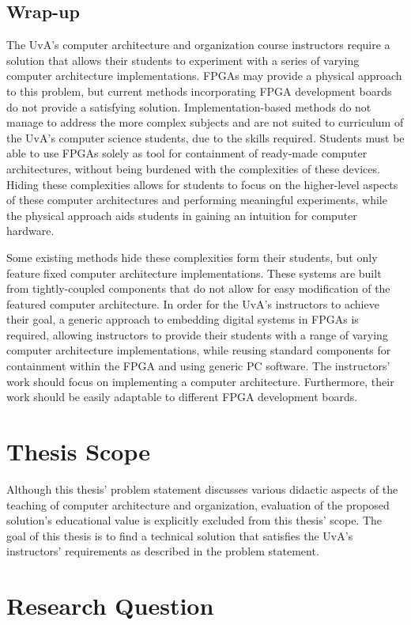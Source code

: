 \documentclass[main.tex]{subfiles}
\begin{document}
\subsection{Wrap-up}
The UvA's computer architecture and organization course instructors require a solution that allows their students to experiment with a series of varying computer architecture implementations. FPGAs may provide a physical approach to this problem, but current methods incorporating FPGA development boards do not provide a satisfying solution. Implementation-based methods do not manage to address the more complex subjects and are not suited to curriculum of the UvA's computer science students, due to the skills required. Students must be able to use FPGAs solely as tool for containment of ready-made computer architectures, without being burdened with the complexities of these devices. Hiding these complexities allows for students to focus on the higher-level aspects of these computer architectures and performing meaningful experiments, while the physical approach aids students in gaining an intuition for computer hardware.

Some existing methods hide these complexities form their students, but only feature fixed computer architecture implementations. These systems are built from tightly-coupled components that do not allow for easy modification of the featured computer architecture. In order for the UvA's instructors to achieve their goal, a generic approach to embedding digital systems in FPGAs is required, allowing instructors to provide their students with a range of varying computer architecture implementations, while reusing standard components for containment within the FPGA and using generic PC software. The instructors' work should focus on implementing a computer architecture. Furthermore, their work should be easily adaptable to different FPGA development boards.

\section{Thesis Scope}
Although this thesis' problem statement discusses various didactic aspects of the teaching of computer architecture and organization, evaluation of the proposed solution's educational value is explicitly excluded from this thesis' scope. The goal of this thesis is to find a technical solution that satisfies the UvA's instructors' requirements as described in the problem statement. 


\section{Research Question}
\end{document}
